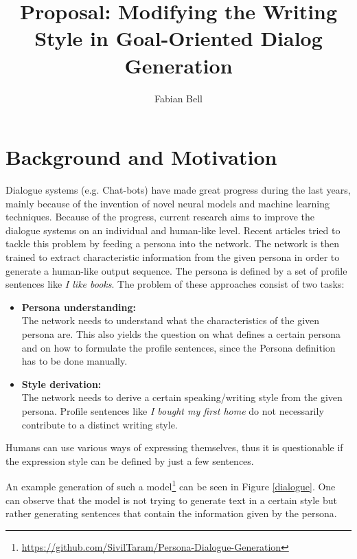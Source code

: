 \documentclass[11pt]{article}
\title{Proposal: Modifying the Writing Style in Goal-Oriented Dialog Generation}
\author{Fabian Bell}
\date
\begin{document}
\maketitle
\section{Background and Motivation}
Dialogue systems (e.g. Chat-bots) have made great progress during the last years, mainly because of the invention of novel neural models and machine learning techniques. Because of the progress, current research aims to improve the dialogue systems on an individual and human-like level. Recent articles \cite[]{DBLP:journals/corr/abs-1901-08149, liu2020impress} tried to tackle this problem by feeding a persona into the network. The network is then trained to extract characteristic information from the given persona in order to generate a human-like output sequence. The persona is defined by a set of profile sentences like \textit{I like books}. The problem of these approaches consist of two tasks:
\begin{itemize}
\item \textbf{Persona understanding:}\\
The network needs to understand what the characteristics of the given persona are. This also yields the question on what defines a certain persona and on how to formulate the profile sentences, since the Persona definition has to be done manually. 
\item \textbf{Style derivation:}\\
The network needs to derive a certain speaking/writing style from the given persona. Profile sentences like \textit{I bought my first home} \cite[]{liu2020impress} do not necessarily contribute to a distinct writing style.
\end{itemize}
Humans can use various ways of expressing themselves, thus it is questionable if the expression style can be defined by just a few sentences. 

An example generation of such a model\footnote{\url{https://github.com/SivilTaram/Persona-Dialogue-Generation}} can be seen in Figure \ref{dialogue}. One can observe that the model is not trying to generate text in a certain style but rather generating sentences that contain the information given by the persona. 
\end{document}
